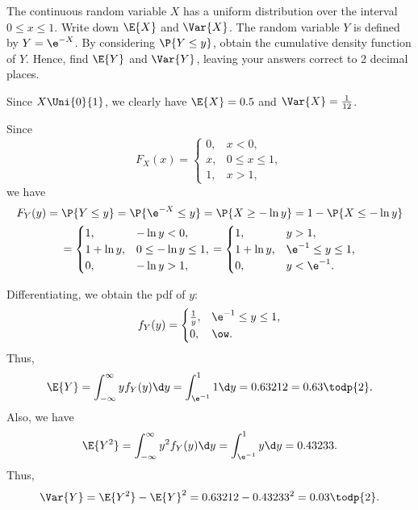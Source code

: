 \begin{problem}
    The continuous random variable $X$ has a uniform distribution over the interval $0\leq x \leq1$. Write down $\E{X}$ and $\Var{X}$. The random variable $Y$ is defined by $Y=\e^{-X}$. By considering $\P{Y\leq y}$, obtain the cumulative density function of $Y$. Hence, find $\E{Y}$ and $\Var{Y}$, leaving your answers correct to 2 decimal places.
\end{problem}
\begin{solution}
    Since $X \Uni{0}{1}$, we clearly have $\E{X} = 0.5$ and $\Var{X} = \frac1{12}$.

    Since \[F_X(x) = \begin{cases}
        0, & x < 0,\\
        x, & 0 \leq x \leq 1,\\
        1, & x > 1,
    \end{cases}\] we have
    \begin{gather*}
        F_Y(y) = \P{Y \leq y} = \P{\e^{-X} \leq y} = \P{X \geq -\ln y} = 1 - \P{X \leq -\ln y} \\
        = \begin{cases}
            1, & -\ln y < 0,\\
            1 + \ln y, & 0 \leq -\ln y \leq 1,\\
            0, & -\ln y > 1,
        \end{cases}
        = \begin{cases}
            1, & y > 1,\\
            1 + \ln y, & \e^{-1} \leq y \leq 1,\\
            0, & y < \e^{-1}.
        \end{cases}
    \end{gather*}

    Differentiating, we obtain the pdf of $y$: \[f_Y(y) = \begin{cases}
        \frac1{y}, & \e^{-1} \leq y \leq 1,\\
        0, & \ow.
    \end{cases}\] Thus, \[\E{Y} = \int_{-\infty}^\infty y f_Y(y) \d y = \int_{\e^{-1}}^1 1 \d y = 0.63212 = 0.63 \todp{2}.\] Also, we have \[\E{Y^2} = \int_{-\infty}^\infty y^2 f_Y(y) \d y = \int_{\e^{-1}}^1 y \d y = 0.43233.\] Thus, \[\Var{Y} = \E{Y^2} - \E{Y}^2 = 0.63212 - 0.43233^2 = 0.03 \todp{2}.\]
\end{solution}

